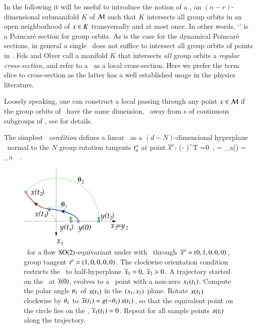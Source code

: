 In the following it will be useful to introduce the
notion of a \emph{\slice}, an $(n-r)$-dimensional submanifold $K$
of $\mathcal{M}$ such that $K$ intersects all group orbits in an
open neighborhood of $x \in K$ transversally and at most once. 
In other words, `\slice' is a Poincar\'e section
for group orbits. As is the case for the dynamical Poincar\'e sections,
in general a single \slice\ does not suffice to intersect all
group orbits of points in \pS. Fels and Olver
call a manifold $K$ that intersects \emph{all} group orbits a
\emph{regular cross-section}, and refer to a \slice\ as a local
cross-section. Here we prefer the term slice
to cross-section as the latter has a well established usage in the physics
literature.

Loosely speaking, one can construct a local {\csection} passing
through any point $x\in \mathcal{M}$ if the group orbits of \Group\
have the same dimension, \ie\ away from {\fixedsp s}
of continuous subgroups of \Group, see  for
details.

The simplest {\em \slice\ condition} defines a linear \slice\ as a
$(d\!-\!N)$-dim\-ens\-ion\-al hyperplane \pSRed\ normal to
the $N$ group rotation tangents $t^o_{a}$ at point ${\overline{x}^o}$:
\beq
(\sspRed - \slicep )^T  =0
    \,,\qquad
{} = \groupTan_a(\slicep) = \Lg_a \, \slicep
\,.

\begin{figure}
 \begin{center}
  \includegraphics[width=0.5\textwidth]{../figs/ESunrot}
 \end{center}
 \label{fig:ESunrot}
 \caption{\Mframes\ for a flow $\textrm{SO}(2)$-equivariant under
 with \slice\ through ${\overline{x}^o}=(0,1,0,0,0)$,
group tangent $t^o_{}=(1,0,0,0,0)$. The clockwise
orientation condition restricts the \slice\ to half-hyperplane
$\overline{x}_1=0,\;\overline{x}_2>0$. A trajectory started on the
\slice\ at $\overline{x}(0)$, evolves to a \statesp\ point with a
non-zero $x_1(t_1)$. Compute the polar angle ${\bf \theta}_1$
of $x(t_1)$ in the $(x_1,x_2)$ plane. Rotate $x(t_1)$
clockwise by ${\bf \theta}_1$ to $\overline{x}(t_1) =
g(-{\bf \theta}_1)\,x(t_1)$, so that the equivalent point
on the circle lies on the \slice, $\overline{x}_1(t_1) =0$. Repeat
for all sample points $x(t_i)$ along the trajectory.}
\end{figure}


